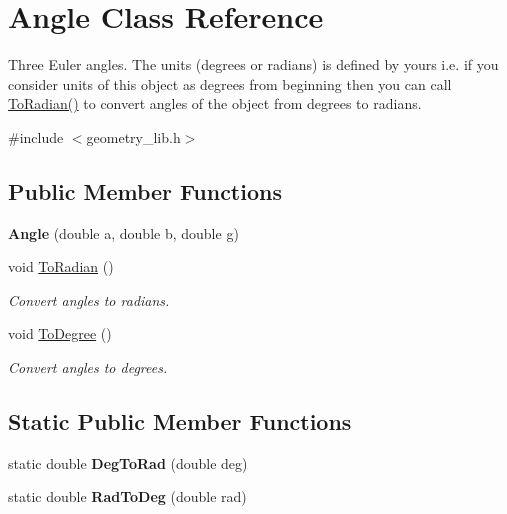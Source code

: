 \hypertarget{class_angle}{}\section{Angle Class Reference}
\label{class_angle}


Three Euler angles. The units (degrees or radians) is defined by yours i.\+e. if you consider units of this object as degrees from beginning then you can call \mbox{\hyperlink{class_angle_a72dd5f472528fe9edaaafaf91d71670e}{To\+Radian()}} to convert angles of the object from degrees to radians.  




{\ttfamily \#include $<$geometry\+\_\+lib.\+h$>$}

\subsection*{Public Member Functions}
\begin{DoxyCompactItemize}
\item 
\mbox{\label{class_angle_a3b9936babc6a849c86cea39317302184}} 
{\bfseries Angle} (double a, double b, double g)
\item 
\mbox{\label{class_angle_a72dd5f472528fe9edaaafaf91d71670e}} 
void \mbox{\hyperlink{class_angle_a72dd5f472528fe9edaaafaf91d71670e}{To\+Radian}} ()
\begin{DoxyCompactList}\small\item\em Convert angles to radians. \end{DoxyCompactList}\item 
\mbox{\label{class_angle_ab79580abdca9837cf9028651ba9aee80}} 
void \mbox{\hyperlink{class_angle_ab79580abdca9837cf9028651ba9aee80}{To\+Degree}} ()
\begin{DoxyCompactList}\small\item\em Convert angles to degrees. \end{DoxyCompactList}\end{DoxyCompactItemize}
\subsection*{Static Public Member Functions}
\begin{DoxyCompactItemize}
\item 
\mbox{\label{class_angle_aa99f6ac9b7eb6349a69db893612e23de}} 
static double {\bfseries Deg\+To\+Rad} (double deg)
\item 
\mbox{\label{class_angle_ad365186733ffaa5cb9870379366e9a1e}} 
static double {\bfseries Rad\+To\+Deg} (double rad)
\end{DoxyCompactItemize}
